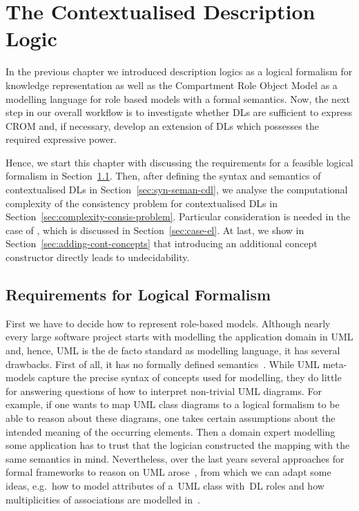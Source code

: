 
\chapter{The Contextualised Description Logic \texorpdfstring{\LMLO}{LM⟦LO⟧}}
\label{cha:context-dls}

In the previous chapter we introduced description logics as a logical formalism for knowledge
representation as well as the Compartment Role Object Model as a modelling language for role based
models with a formal semantics. Now, the next step in our overall workflow is to investigate whether
DLs are sufficient to express CROM and, if necessary, develop an extension of DLs which possesses
the required expressive power.

Hence, we start this chapter with discussing the requirements for a feasible logical formalism in
Section~\ref{sec:requirements-and-CDLs}. Then, after defining the syntax and semantics of
contextualised DLs in Section~\ref{sec:syn-seman-cdl}, we analyse the computational complexity of
the consistency problem for contextualised DLs in
Section~\ref{sec:complexity-consis-problem}. Particular consideration is needed in the case of \EL,
which is discussed in Section~\ref{sec:case-el}. At last, we show in
Section~\ref{sec:adding-cont-concepts} that introducing an additional concept constructor directly
leads to undecidability.


\section{Requirements for Logical Formalism}
\label{sec:requirements-and-CDLs}

First we have to decide how to represent role-based models. Although nearly every large software
project starts with modelling the application domain in UML and, hence, UML is the de facto standard
as modelling language, it has several drawbacks. First of all, it has no formally defined
semantics~\cite{FrEL-CSI98}. While UML meta-models capture the precise syntax of concepts used for
modelling, they do little for answering questions of how to interpret non-trivial UML diagrams.  For
example, if one wants to map UML class diagrams to a logical formalism to be able to reason about
these diagrams, one takes certain assumptions about the intended meaning of the occurring
elements. Then a domain expert modelling some application has to trust that the logician constructed
the mapping with the same semantics in mind. Nevertheless, over the last years several approaches
for formal frameworks to reason on UML
arose~\cite{Eva-WIFT98,CaCG-ISMIS02,StMS-UML03,SiSJ-OBJ04,BeCG-AI05,SiBH-IJSEKE08,AhNa-ICET10}, from
which we can adapt some ideas, e.g.\ how to model attributes of a~UML class with~DL roles and how
multiplicities of associations are modelled in~\cite{CaCG-ISMIS02}.

